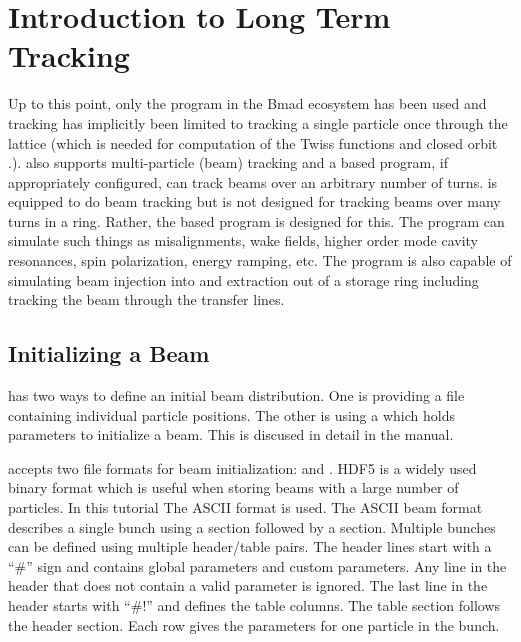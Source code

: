 \documentclass{hitec}     %
\begin{document}
{\newpage

\section{Introduction to Long Term Tracking}

Up to this point, only the \tao program in the Bmad ecosystem has been used and tracking has implicitly been limited to tracking
a single particle once through the lattice (which is needed for computation of the Twiss functions and closed orbit .).
\bmad also supports multi-particle (beam) tracking and a \bmad based program, if appropriately configured, 
can track beams over an arbitrary number of turns. 
\tao is equipped to do beam tracking but \tao is not designed for tracking beams over many turns in a ring. 
Rather, the \bmad based program \ltt is designed for this. 
The \ltt program can simulate such things as misalignments, wake fields, higher order mode cavity resonances, spin polarization, energy ramping, etc. The \ltt program is also capable of simulating beam injection into and extraction 
out of a storage ring including tracking the beam through the transfer lines.

\subsection{Initializing a Beam}

\bmad has two ways to define an initial beam distribution. One is providing a file containing individual particle positions. The other is using a  which holds parameters to initialize a beam. This is discused in detail
in the \bmad manual.

\bmad accepts two file formats for beam initialization:  and . 
HDF5 is a widely used binary format which is useful when storing beams with a large number of particles.
In this tutorial The ASCII format is used. 
The ASCII beam format describes a single bunch using a  section followed by a  section. Multiple bunches can be defined using multiple header/table pairs. The header lines start with a “\#” sign and contains global parameters and custom parameters. Any line in the header that does not contain a valid parameter is ignored. The last line in the header starts with “\#!” and defines the table columns. The table section follows the header section. Each row gives the parameters for one particle in the bunch.

}
\end{document}
